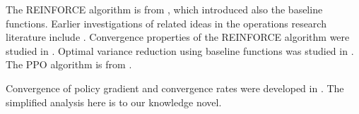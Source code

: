 The REINFORCE algorithm is from \cite{Williams92}, which introduced also the baseline functions. Earlier investigations of related ideas in the operations research literature include \cite{glynn1990likelihood,fu1994optimization}. Convergence properties of the REINFORCE algorithm were studied in \cite{PhansalkarT95,baxter2001infinite,marbach2002simulation}. Optimal variance reduction using baseline functions was studied in \cite{greensmith2004variance}.
The PPO algorithm is from \cite{schulman2017proximal}.

Convergence of policy gradient and convergence rates were developed in \citep{shani2020adaptive,bhandari2024global}. The simplified analysis here is to our knowledge novel.





%



